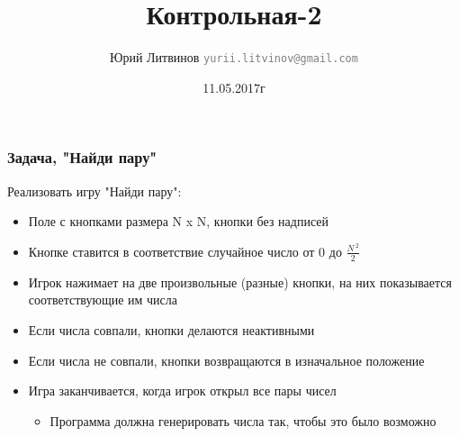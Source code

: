 \documentclass[xetex,mathserif,serif]{beamer}
\title{Контрольная-2}
\author[Юрий Литвинов]{Юрий Литвинов \newline \textcolor{gray}{\small\texttt{yurii.litvinov@gmail.com}}}
\date{11.05.2017г}
\begin{document}
	
	\frame{\titlepage}
	
	\begin{frame}
		\frametitle{Задача, "Найди пару"}
		Реализовать игру "Найди пару":
		\begin{itemize}
			\item Поле с кнопками размера N x N, кнопки без надписей
			\item Кнопке ставится в соответствие случайное число от 0 до $\frac{N ^{\ 2}}{2}$
			\item Игрок нажимает на две произвольные (разные) кнопки, на них показывается соответствующие им числа 
			\item Если числа совпали, кнопки делаются неактивными
			\item Если числа не совпали, кнопки возвращаются в изначальное положение
			\item Игра заканчивается, когда игрок открыл все пары чисел
			\begin{itemize}
				\item Программа должна генерировать числа так, чтобы это было возможно
			\end{itemize}
		\end{itemize}
	\end{frame}
\end{document}
